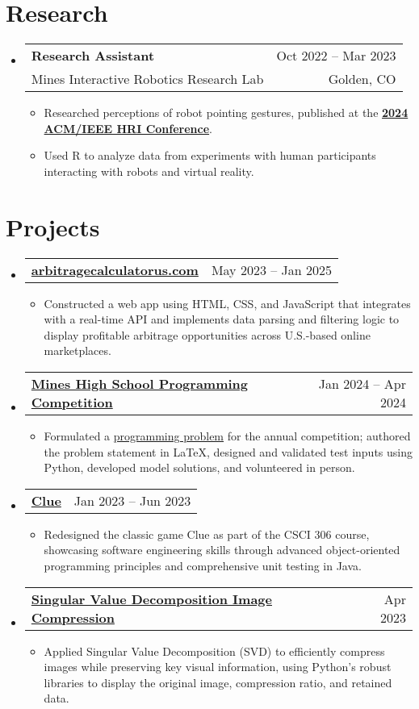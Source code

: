 \documentclass[letterpaper,11pt]{article}
\makeatletter
\newcommand{\resumeItem}[1]{
  \item\small{
    {#1 \vspace{-2pt}}
  }
}
\newcommand{\resumeSubheading}[4]{
  \vspace{-2pt}\item
    \begin{tabular*}{0.97\textwidth}[t]{l@{\extracolsep{\fill}}r}
      \textbf{#1} & {\small #2} \\
      {\small #3} & {\small #4} \\
    \end{tabular*}\vspace{-7pt}
}
\newcommand{\resumeProjectHeading}[2]{
    \item
    \begin{tabular*}{0.97\textwidth}{l@{\extracolsep{\fill}}r}
      \small{\textbf{#1}} & \small{#2} \\
    \end{tabular*}\vspace{-7pt}
}
\newcommand{\resumeSubHeadingListStart}{\begin{itemize}[leftmargin=0.15in, label={}]}
\newcommand{\resumeSubHeadingListEnd}{\end{itemize}}
\newcommand{\resumeItemListStart}{\begin{itemize}}
\newcommand{\resumeItemListEnd}{\end{itemize}\vspace{-5pt}}
\makeatother
\begin{document}
\section{Research}
    \resumeSubHeadingListStart
      \resumeSubheading
      {Research Assistant}{Oct 2022 -- Mar 2023}
      {Mines Interactive Robotics Research Lab}{Golden, CO}
          \resumeItemListStart
            \resumeItem
            {Researched perceptions of robot pointing gestures, published at the \href{https://doi.org/10.1145/3610977.3634924}{\textbf{2024 ACM/IEEE HRI Conference}}.}
            \resumeItem{Used R to analyze data from experiments with human participants interacting with robots and virtual reality.}
          \resumeItemListEnd
    \resumeSubHeadingListEnd
  
\section{Projects}
    \resumeSubHeadingListStart
          \resumeProjectHeading
          {\href{https://keenanschott.com/portfolio/\#project-arbitragecalculatorus}{arbitragecalculatorus.com}}{May 2023 -- Jan 2025}
          \resumeItemListStart
            \resumeItem{Constructed a web app using HTML, CSS, and JavaScript that integrates with a real-time API and implements data parsing and filtering logic to display profitable arbitrage opportunities across U.S.-based online marketplaces.}
          \resumeItemListEnd
      \resumeProjectHeading
          {\href{https://keenanschott.com/portfolio/\#project-hspc}{Mines High School Programming Competition}}{Jan 2024 -- Apr 2024}
          \resumeItemListStart
            \resumeItem{Formulated a \href{https://mines-hspc.kattis.com/contests/mines-hspc24/problems/nostragglers}{programming problem} for the annual competition; authored the problem statement in \LaTeX, designed and validated test inputs using Python, developed model solutions, and volunteered in person.}
          \resumeItemListEnd
      \resumeProjectHeading
          {\href{https://keenanschott.com/portfolio/\#project-clue}{Clue}}{Jan 2023 -- Jun 2023}
          \resumeItemListStart
            \resumeItem{Redesigned the classic game Clue as part of the CSCI 306 course, showcasing software engineering skills through advanced object-oriented programming principles and comprehensive unit testing in Java.}
          \resumeItemListEnd
      \resumeProjectHeading
          {\href{https://keenanschott.com/portfolio/\#project-svd}{Singular Value Decomposition Image Compression}}{Apr 2023}
          \resumeItemListStart
            \resumeItem{Applied Singular Value Decomposition (SVD) to efficiently compress images while preserving key visual information, using Python's robust libraries to display the original image, compression ratio, and retained data.}
          \resumeItemListEnd
    \resumeSubHeadingListEnd
\end{document}

